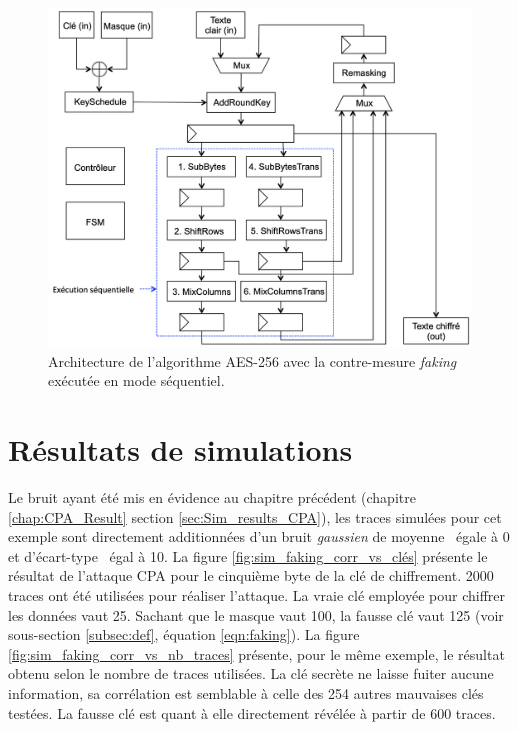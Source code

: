 \documentclass[oneside]{book}
\begin{document}
\begin{figure}[ht!]
    \hspace{-0.7cm}
    \includegraphics[scale=0.8]{image/FPGA_arch_faking_sequentielle}
    \caption{Architecture de l’algorithme AES-256 avec la contre-mesure \textit{faking} exécutée en mode séquentiel.}
    \label{fig:FPGA_arch_faking_sequentielle} 
    \vspace{1cm}
\end{figure}

\section{Résultats de simulations}
\label{sec:Sim_results_Faking}

Le bruit ayant été mis en évidence au chapitre précédent (chapitre \ref{chap:CPA_Result} section \ref{sec:Sim_results_CPA}), les traces simulées pour cet exemple sont directement additionnées d'un bruit \textit{gaussien} de moyenne \mu \ égale à 0 et d'écart-type \sigma \ égal à 10. La figure \ref{fig:sim_faking_corr_vs_clés} présente le résultat de l'attaque CPA pour le cinquième byte de la clé de chiffrement. 2000 traces ont été utilisées pour réaliser l'attaque. La vraie clé employée pour chiffrer les données vaut 25. Sachant que le masque vaut 100, la fausse clé vaut 125 (voir sous-section \ref{subsec:def}, équation \ref{eqn:faking}). La figure \ref{fig:sim_faking_corr_vs_nb_traces} présente, pour le même exemple, le résultat obtenu selon le nombre de traces utilisées. La clé secrète ne laisse fuiter aucune information, sa corrélation est semblable à celle des 254 autres mauvaises clés testées. La fausse clé est quant à elle directement révélée à partir de 600 traces.
\end{document}
